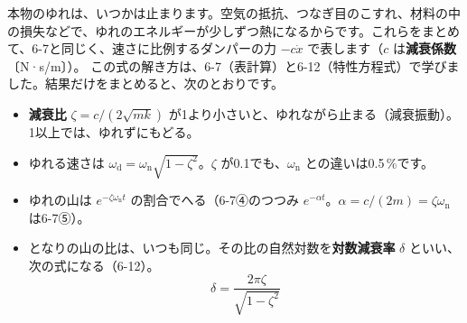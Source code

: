 \label{ph:波-1:sec7}
本物のゆれは、いつかは止まります。空気の抵抗、つなぎ目のこすれ、材料の中の損失などで、ゆれのエネルギーが少しずつ熱になるからです。これらをまとめて、6-7と同じく、速さに比例するダンパーの力 $-c\dot x$ で表します（$c$ は\textbf{減衰係数}〔N·s/m〕）。
この式の解き方は、6-7（表計算）と6-12（特性方程式）で学びました。結果だけをまとめると、次のとおりです。
\begin{itemize}[leftmargin=1.2\zw, itemsep=2pt, topsep=2pt, label={\color{bkTheme}●}]
\item \textbf{減衰比} $\zeta=c/(2\sqrt{mk})$ が1より小さいと、ゆれながら止まる（減衰振動）。1以上では、ゆれずにもどる。
\item ゆれる速さは $\omega_{\mathrm d}=\omega_{\mathrm n}\sqrt{1-\zeta^2}$。$\zeta$ が0.1でも、$\omega_{\mathrm n}$ との違いは0.5\,\%です。
\item ゆれの山は $e^{-\zeta\omega_{\mathrm n}t}$ の割合でへる（6-7④のつつみ $e^{-\alpha t}$。$\alpha=c/(2m)=\zeta\omega_{\mathrm n}$ は6-7⑤）。
\item となりの山の比は、いつも同じ。その比の自然対数を\textbf{対数減衰率} $\delta$ といい、次の式になる（6-12）。
\[\delta=\frac{2\pi\zeta}{\sqrt{1-\zeta^2}}\]
\end{itemize}

